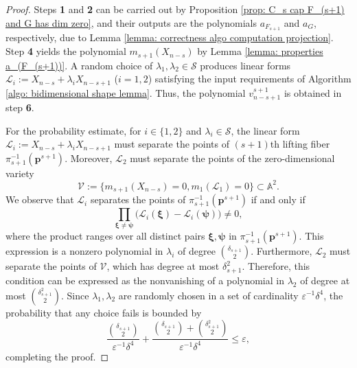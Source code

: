 \documentclass[pdflatex,sn-basic]{sn-jnl}%
\theoremstyle{thmstyleone}%
\theoremstyle{thmstyletwo}%
\theoremstyle{thmstylethree}%
\theoremstyle{definition}
\numberwithin{equation}{section}
\newcommand{\bfs}{\boldsymbol}
\newcommand{\A}{\mathbb A}
\begin{document}
\begin{proof}
Steps {\bf 1} and {\bf 2} can be carried out by Proposition
\ref{prop: C_s cap F_(s+1) and G has dim zero}, and their outputs
are the polynomials $a_{F_{s+1}}$ and $a_G$, respectively, due to
Lemma \ref{lemma: correctness algo computation projection}. Step
{\bf 4} yields the polynomial $m_{s+1}(X_{n-s})$ by Lemma
\ref{lemma: properties a_(F_(s+1))}. A random choice of
$\lambda_1,\lambda_2\in\mathcal{S}$ produces linear forms
$\mathcal{L}_i:=X_{n-s}+\lambda_i X_{n-s+1}$ ($i=1,2$) satisfying
the input requirements of Algorithm \ref{algo: bidimensional shape
lemma}. Thus, %
the polynomial $v_{n-s+1}^{s+1}$ is obtained in step {\bf 6}.

For the probability estimate, for $i\in\{1,2\}$ and
$\lambda_i\in\mathcal{S}$, the linear form
$\mathcal{L}_i:=X_{n-s}+\lambda_iX_{n-s+1}$ must separate the points
of $(s+1)$th lifting fiber $\pi_{s+1}^{-1}(\bfs p^{s+1})$. Moreover,
$\mathcal{L}_2$ must separate the points of the zero-dimensional
variety
$$\mathcal{V}:=\{m_{s+1}(X_{n-s})=0,m_1(\mathcal{L}_1)=0\}\subset\A^2.$$
We observe that $\mathcal{L}_i$ separates the points of
$\pi_{s+1}^{-1}(\bfs p^{s+1})$ if and only if
%
$$\prod_{\bfs \xi\not=\bfs\psi}\big(\mathcal{L}_i(\bfs\xi)
-\mathcal{L}_i(\bfs\psi)\big)\not=0,$$
%
where the product ranges over all distinct pairs $\bfs\xi,\bfs\psi$
in $\pi_{s+1}^{-1}(\bfs p^{s+1})$. This expression is a nonzero
polynomial in $\lambda_i$ of degree ${\delta_{s+1}\choose 2}$.
Furthermore, $\mathcal{L}_2$ must separate the points of
$\mathcal{V}$, which has degree at most $\delta_{s+1}^2$. Therefore,
this condition can be expressed as the nonvanishing of a polynomial
in $\lambda_2$ of degree at most ${\delta_{s+1}^2\choose 2}$. Since
$\lambda_1,\lambda_2$ are randomly chosen in a set of cardinality
$\varepsilon^{-1}\delta^4$, the probability that any choice fails is
bounded by
%
$$\frac{{\delta_{s+1}\choose 2}}{
\varepsilon^{-1}\delta^4}+ \frac{{\delta_{s+1}\choose 2}+
{\delta_{s+1}^2\choose 2}}{
\varepsilon^{-1}\delta^4}\le\varepsilon,$$
%
completing the proof.
\end{proof}
\end{document}
